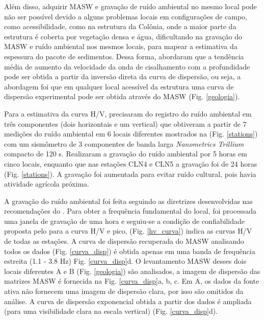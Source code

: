 \documentclass[smallextended]{svjour3}       %
\begin{document}
Além disso, adquirir MASW e gravação de ruído ambiental no mesmo local pode não ser possível devido a alguns problemas locais em configurações de campo, como acessibilidade, como na estrutura da Colônia, onde a maior parte da estrutura é coberta por vegetação densa e água, dificultando na gravação do MASW e ruído ambiental nos mesmos locais, para mapear a estimativa da espessura do pacote de sedimentos. Dessa forma, abordaram que a tendência média de aumento da velocidade da onda de cisalhamento com a profundidade pode ser obtida a partir da inversão direta da curva de dispersão, ou seja, a abordagem foi que em qualquer local acessível da estrutura uma curva de dispersão experimental pode ser obtida através do MASW (Fig. \ref{geologia}). 

Para a estimativa da curva H/V, precisaram do registro do ruído ambiental em três componentes (dois horizontais e um vertical) que obtiveram a partir de 7 medições do ruído ambiental em 6 locais diferentes mostrados na (Fig. \ref{stations}) com um sismômetro de 3 componentes de banda larga \textit{Nanometrics Trillium} compacto de 120 s. Realizaram a gravação do ruído ambiental por 5 horas em cinco locais, enquanto que nas estações CLN4 e CLN5 a gravação foi de 24 horas (Fig. \ref{stations}). A gravação foi aumentada para evitar ruído cultural, pois havia atividade agrícola próxima.

A gravação do ruído ambiental foi feita seguindo as diretrizes desenvolvidas nas recomendações do \cite{acerra2004guidelines}. Para obter a frequência fundamental do local, foi processada uma janela de gravação de uma hora e seguiu-se a condição de confiabilidade proposta pelo \cite{acerra2004guidelines} para a curva H/V e pico, (Fig. \ref{hv_curva}) indica as curvas H/V de todas as estações. A curva de dispersão recuperada do MASW analisando todos os dados (Fig. \ref{curva_disp}) é obtida apenas em uma banda de frequência estreita (1.1 - 3.8 Hz) Fig. \ref{curva_disp}d. O levantamento MASW desses dois locais diferentes A e B (Fig. \ref{geologia}) são analisados, a imagem de dispersão das matrizes MASW é fornecida na Fig. \ref{curva_disp}a, b, c. Em A, os dados da fonte ativa não fornecem uma imagem de dispersão clara, por isso são omitidos da análise. A curva de dispersão exponencial obtida a partir dos dados é ampliada (para uma visibilidade clara na escala vertical) (Fig. \ref{curva_disp}d).
\end{document}
